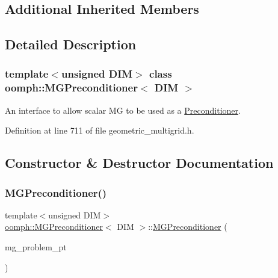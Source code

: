 \subsection*{Additional Inherited Members}


\subsection{Detailed Description}
\subsubsection*{template$<$unsigned D\+IM$>$\newline
class oomph\+::\+M\+G\+Preconditioner$<$ D\+I\+M $>$}

An interface to allow scalar MG to be used as a \hyperlink{classoomph_1_1Preconditioner}{Preconditioner}. 

Definition at line 711 of file geometric\+\_\+multigrid.\+h.



\subsection{Constructor \& Destructor Documentation}
\mbox{\label{classoomph_1_1MGPreconditioner_a57daf87cd60b23d39670c462afba7371}} 
\subsubsection{\texorpdfstring{M\+G\+Preconditioner()}{MGPreconditioner()}\hspace{0.1cm}{\footnotesize\ttfamily [1/2]}}
{\footnotesize\ttfamily template$<$unsigned D\+IM$>$ \\
\hyperlink{classoomph_1_1MGPreconditioner}{oomph\+::\+M\+G\+Preconditioner}$<$ D\+IM $>$\+::\hyperlink{classoomph_1_1MGPreconditioner}{M\+G\+Preconditioner} (\begin{DoxyParamCaption}\item[{\hyperlink{classoomph_1_1MGProblem}{M\+G\+Problem} $\ast$}]{mg\+\_\+problem\+\_\+pt }\end{DoxyParamCaption})\hspace{0.3cm}{\ttfamily [inline]}}



